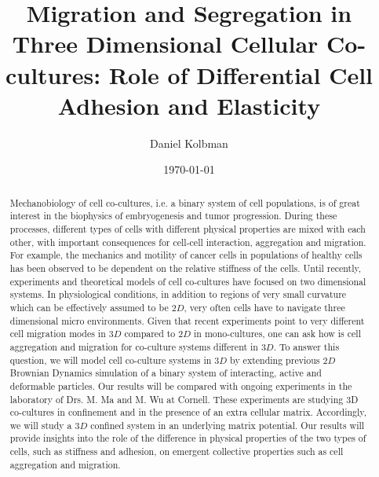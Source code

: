 \documentclass[aps,prb,twocolumn,groupedaddress,nofootinbib,floatfix]{revtex4}
\begin{document}
%
\title{Migration and Segregation in Three Dimensional Cellular Co-cultures: Role of
Differential Cell Adhesion and Elasticity}

%
\author{Daniel Kolbman}
%
%
%

\date{\today}

\begin{abstract} \noindent Mechanobiology of cell co-cultures, i.e. a binary system of cell populations, is of great interest in the biophysics of embryogenesis and tumor progression. 
During these processes, different types of cells with different physical properties are mixed with each other, with important consequences for cell-cell interaction, aggregation and migration. 
For example, the mechanics and motility of cancer cells in populations of healthy cells has been observed to be dependent on the relative stiffness of the cells. 
Until recently, experiments and theoretical models of cell co-cultures have focused on two dimensional systems.
In physiological conditions, in addition to regions of very small curvature which can be effectively assumed to be $2D$, very often cells have to navigate three dimensional micro environments.
Given that recent experiments point to very different cell migration modes in $3D$ compared to $2D$ in mono-cultures, one can ask how is cell aggregation and migration for co-culture systems different in $3D$.
To answer this question, we will model cell co-culture systems in $3D$ by extending previous $2D$ Brownian Dynamics simulation of a binary system of interacting, active and deformable particles.
Our results will be compared with ongoing experiments in the laboratory of Drs. M. Ma and M. Wu at Cornell.
These experiments are studying 3D co-cultures in confinement and in the presence of an extra cellular matrix.
Accordingly, we will study a $3D$ confined system in an underlying matrix potential.
Our results will provide insights into the role of the difference in physical properties of the two types of cells, such as stiffness and adhesion,
on emergent collective properties such as cell aggregation and migration.  

\end{abstract}
\end{document}
